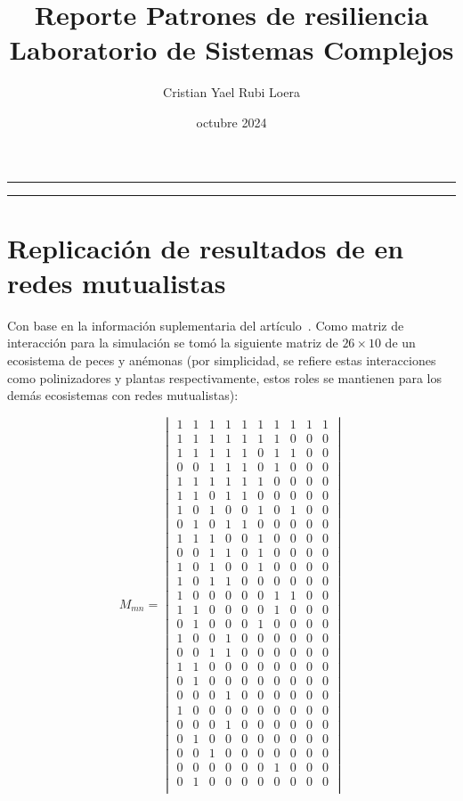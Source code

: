 \documentclass[11pt]{article}
\title{\textsf{
    Reporte Patrones de resiliencia\\
Laboratorio de Sistemas Complejos}}
\author{Cristian Yael Rubi Loera}
\date{octubre 2024}
\begin{document}
 \begin{minipage}[t]{\textwidth}
   \centering
   \raisebox{-\baselineskip}{\rule{\textwidth}{1px}}
   \rule{\textwidth}{1px}
   \vspace{0.2cm}
   \maketitle
   \rule{\textwidth}{2px}
 \end{minipage}
 
\newpage

\setcounter{page}{2}

\section{Replicación de resultados de en redes mutualistas}


Con base en la información suplementaria del artículo~\cite{gao2016universal}.
Como matriz de interacción para la simulación se tomó la siguiente matriz de $26 \times 10$ de un ecosistema de peces y anémonas (por simplicidad, se refiere estas interacciones como polinizadores y plantas respectivamente, estos roles se mantienen para los demás ecosistemas con redes mutualistas):

\begin{equation*}
M_{mn}=\begin{vmatrix}
1&1&1&1&1&1&1&1&1&1\\
1&1&1&1&1&1&1&0&0&0\\
1&1&1&1&1&0&1&1&0&0\\
0&0&1&1&1&0&1&0&0&0\\
1&1&1&1&1&1&0&0&0&0\\
1&1&0&1&1&0&0&0&0&0\\
1&0&1&0&0&1&0&1&0&0\\
0&1&0&1&1&0&0&0&0&0\\
1&1&1&0&0&1&0&0&0&0\\
0&0&1&1&0&1&0&0&0&0\\
1&0&1&0&0&1&0&0&0&0\\
1&0&1&1&0&0&0&0&0&0\\
1&0&0&0&0&0&1&1&0&0\\
1&1&0&0&0&0&1&0&0&0\\
0&1&0&0&0&1&0&0&0&0\\
1&0&0&1&0&0&0&0&0&0\\
0&0&1&1&0&0&0&0&0&0\\
1&1&0&0&0&0&0&0&0&0\\
0&1&0&0&0&0&0&0&0&0\\
0&0&0&1&0&0&0&0&0&0\\
1&0&0&0&0&0&0&0&0&0\\
0&0&0&1&0&0&0&0&0&0\\
0&1&0&0&0&0&0&0&0&0\\
0&0&1&0&0&0&0&0&0&0\\
0&0&0&0&0&0&1&0&0&0\\
0&1&0&0&0&0&0&0&0&0\\
\end{vmatrix}
\end{equation*}
\end{document}
